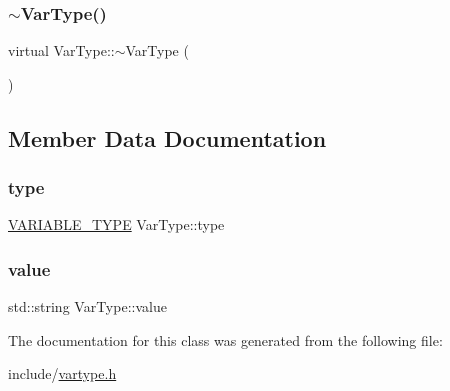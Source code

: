 \subsubsection{\texorpdfstring{$\sim$\+Var\+Type()}{~VarType()}}
{\footnotesize\ttfamily virtual Var\+Type\+::$\sim$\+Var\+Type (\begin{DoxyParamCaption}{ }\end{DoxyParamCaption})\hspace{0.3cm}{\ttfamily [virtual]}}



\subsection{Member Data Documentation}
\mbox{\label{classVarType_ada5e661872d79bc92631a1ac384d459e}} 
\subsubsection{\texorpdfstring{type}{type}}
{\footnotesize\ttfamily \hyperlink{statics_8h_a4c85b3a98d55cc0252806c950379cce0}{V\+A\+R\+I\+A\+B\+L\+E\+\_\+\+T\+Y\+PE} Var\+Type\+::type}

\mbox{\label{classVarType_adeb99cb6a17ce9cee53c165c912a333f}} 
\subsubsection{\texorpdfstring{value}{value}}
{\footnotesize\ttfamily std\+::string Var\+Type\+::value}



The documentation for this class was generated from the following file\+:\begin{DoxyCompactItemize}
\item 
include/\hyperlink{vartype_8h}{vartype.\+h}\end{DoxyCompactItemize}
